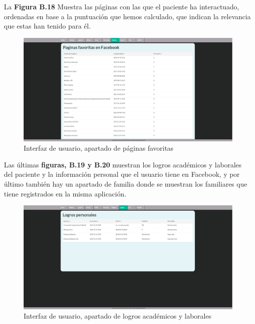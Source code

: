 La \textbf{Figura B.18} Muestra las páginas con las que el paciente ha interactuado, ordenadas en base a la puntuación que hemos calculado, que indican la relevancia que estas han tenido para él.

\begin{figure}
	\begin{center}
		\includegraphics[scale=0.3]{Imagenes/Fuentes/InterfazPaginas.png} \caption{Interfaz de usuario, apartado de páginas favoritas}
		\label{WebAplication8}
	\end{center}
\end{figure}

Las últimas \textbf{figuras, B.19 y B.20} muestran los logros académicos y laborales del paciente y la información personal que el usuario tiene en Facebook, y por último también hay un apartado de familia donde se muestran los familiares que tiene registrados en la misma aplicación.

\begin{figure}
	\begin{center}
		\includegraphics[scale=0.3]{Imagenes/Fuentes/InterfazLogros.png} \caption{Interfaz de usuario, apartado de logros académicos y laborales}
		\label{WebAplication9}
	\end{center}
\end{figure}

